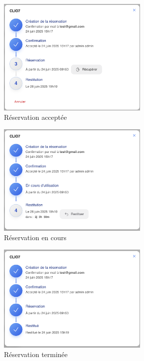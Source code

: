 \documentclass[a4paper,12pt]{article}
\begin{document}
\begin{figure}[h!]
    \centering
    \includegraphics[width=0.65\textwidth]{UTILISATEUR/BOOK_MODAL_ACCEPTED.png}
    \caption{Réservation acceptée}
\end{figure}

\begin{figure}[h!]
    \centering
    \includegraphics[width=0.65\textwidth]{UTILISATEUR/BOOK_MODAL_USED.png}
    \caption{Réservation en cours}
\end{figure}

\begin{figure}[h!]
    \centering
    \includegraphics[width=0.65\textwidth]{UTILISATEUR/BOOK_MODAL_ENDED.png}
    \caption{Réservation terminée}
\end{figure}
\end{document}
